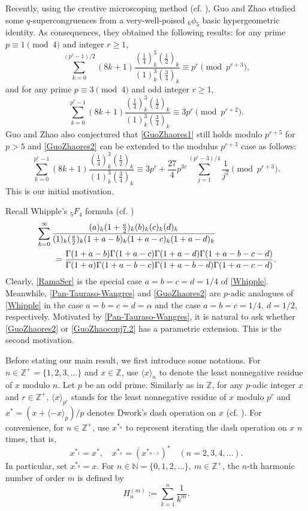 \documentclass[12pt,reqno]{amsart}
\def\f{\frac}
\def\eq{\equiv}
\def\Z{\mathbb Z}
\def\N{\mathbb N}
\def\<{\langle}
\def\>{\rangle}
\theoremstyle{plain}
\theoremstyle{definition}
\theoremstyle{remark}
\numberwithin{equation}{section}
\begin{document}
Recently, using the creative microscoping method (cf. \cite{Guo-Zudilin2019}), Guo and Zhao \cite{Guo-Zhao2026} studied some  $q$-supercongruences from a very-well-poised ${}_6\phi_5$ basic hypergeometric identity. As consequences, they obtained the following results: for any prime $p\eq1\pmod4$ and integer $r\geq1$, 
\begin{equation}\label{GuoZhaores1}
\sum_{k=0}^{(p^r-1)/2}(8k+1)\f{(\f14)_k^3(\f12)_k}{(1)_k^3(\f34)_k}\eq p^r\pmod{p^{r+3}},
\end{equation}
and for any prime $p\eq3\pmod4$ and odd integer $r\geq1$,
\begin{equation}\label{GuoZhaores2}
\sum_{k=0}^{p^r-1}(8k+1)\f{(\f14)_k^3(\f12)_k}{(1)_k^3(\f34)_k}\eq 3p^r\pmod{p^{r+2}}.
\end{equation}
Guo and Zhao \cite[Conjectures 7.1 and 7.2]{Guo-Zhao2026} also conjectured that \eqref{GuoZhaores1} still holds modulo $p^{r+5}$ for $p>5$ and \eqref{GuoZhaores2} can be extended to the modulus $p^{r+3}$ case as follows:
\begin{equation}\label{GuoZhaoconj7.2}
\sum_{k=0}^{p^r-1}(8k+1)\f{(\f14)_k^3(\f12)_k}{(1)_k^3(\f34)_k}\eq 3p^r+\f{27}{4}p^{3r}\sum_{j=1}^{(p^r-3)/4}\f{1}{j^2}\pmod{p^{r+3}}.
\end{equation}
This is our initial motivation. 

Recall Whipple's ${}_5F_4$ formula (cf. \cite{Whipple1926})
\begin{align}\label{Whipple}
&\sum_{k=0}^{\infty}\f{(a)_k(1+\f{a}{2})_k(b)_k(c)_k(d)_k}{(1)_k(\f a2)_k(1+a-b)_k(1+a-c)_k(1+a-d)_k}\notag\\
&\qquad=\f{\Gamma(1+a-b)\Gamma(1+a-c)\Gamma(1+a-d)\Gamma(1+a-b-c-d)}{\Gamma(1+a)\Gamma(1+a-b-c)\Gamma(1+a-b-d)\Gamma(1+a-c-d)}.
\end{align}
Clearly, \eqref{RamaSer} is the special case $a=b=c=d=1/4$ of \eqref{Whipple}. Meanwhile, \eqref{Pan-Tauraso-Wangres} and \eqref{GuoZhaores2} are $p$-adic analogues of \eqref{Whipple} in the case $a=b=c=d=\alpha$ and the case $a=b=c=1/4,\ d=1/2$, respectively. Motivated by \eqref{Pan-Tauraso-Wangres}, it is natural to ask whether \eqref{GuoZhaores2} or \eqref{GuoZhaoconj7.2} has a parametric extension. This is the second motivation.

Before stating our main result, we first introduce some notations. For $n\in\Z^+=\{1,2,3,\ldots\}$ and $x\in\Z$, use $\<x\>_n$ to denote the least nonnegative residue of $x$ modulo $n$. Let $p$ be an odd prime. Similarly as in $\Z$, for any $p$-adic integer $x$ and $r\in\Z^+$, $\<x\>_{p^r}$ stands for the least nonnegative residue of $x$ modulo $p^r$ and $x^{\ast}=(x+\<-x\>_p)/p$ denotes Dwork's dash operation on $x$ (cf. \cite{Dwork1969}). For convenience, for $n\in\Z^+$, use $x^{\ast_n}$ to represent iterating the dash operation on $x$ $n$ times, that is,
$$
x^{\ast_1}=x^{\ast},\quad x^{\ast_n}=(x^{\ast_{n-1}})^{\ast}\quad (n=2,3,4,\ldots).
$$
In particular, set $x^{\ast_0}=x$. For $n\in\N=\{0,1,2,\ldots\},\ m\in\Z^+$, the $n$-th harmonic number of order $m$ is defined by
$$
H_n^{(m)}:=\sum_{k=1}^n\f{1}{k^m}.
$$
\end{document}
